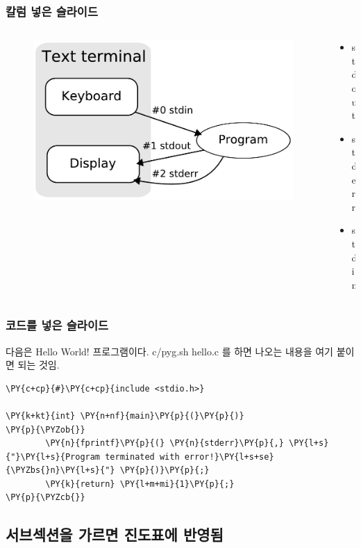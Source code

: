 \documentclass{beamer}
\begin{document}
\begin{frame}
	\frametitle{칼럼 넣은 슬라이드}
	\begin{columns}
	\begin{column}{0.5\textwidth}
		\begin{figure}
		\includegraphics[width=0.9\columnwidth]{svg/Stdstreams-notitle}
		\end{figure}
	\end{column}
	\begin{column}{0.5\textwidth}
		\begin{itemize}
			\item stdout
			\item stderr
			\item stdin
		\end{itemize}
	\end{column}
	\end{columns}
\end{frame}

\begin{frame}[fragile] %
	\frametitle{코드를 넣은 슬라이드}
	다음은 Hello World! 프로그램이다.
	c/pyg.sh hello.c 를 하면 나오는 내용을 여기 붙이면 되는 것임.
\begin{Verbatim}[commandchars=\\\{\}]
\PY{c+cp}{#}\PY{c+cp}{include <stdio.h>}

\PY{k+kt}{int} \PY{n+nf}{main}\PY{p}{(}\PY{p}{)}
\PY{p}{\PYZob{}}
        \PY{n}{fprintf}\PY{p}{(} \PY{n}{stderr}\PY{p}{,} \PY{l+s}{"}\PY{l+s}{Program terminated with error!}\PY{l+s+se}{\PYZbs{}n}\PY{l+s}{"} \PY{p}{)}\PY{p}{;}
        \PY{k}{return} \PY{l+m+mi}{1}\PY{p}{;}
\PY{p}{\PYZcb{}}
\end{Verbatim}
\end{frame}

\subsection{서브섹션을 가르면 진도표에 반영됨}
\end{document}
